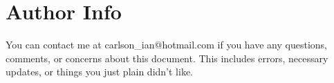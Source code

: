 
\chapter{Author Info}
\label{chap:authorinfo}

You can contact me at carlson\_ian@hotmail.com if you have any questions, comments, or concerns about this document. This includes errors, necessary updates, or things you just plain didn't like.